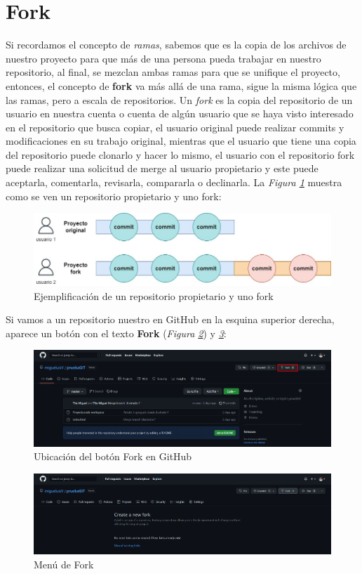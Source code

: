 \section{Fork}

Si recordamos el concepto de \textit{ramas}, sabemos que es la copia de los archivos de nuestro proyecto para que más de una persona pueda trabajar en nuestro repositorio, al final, se mezclan ambas ramas para que se unifique el proyecto, entonces, el concepto de \textbf{fork} va más allá de una rama, sigue la misma lógica que las ramas, pero a escala de repositorios. Un \textit{fork} es la copia del repositorio de un usuario en nuestra cuenta o cuenta de algún usuario que se haya visto interesado en el repositorio que busca copiar, el usuario original puede realizar commits y modificaciones en su trabajo original, mientras que el usuario que tiene una copia del repositorio puede clonarlo y hacer lo mismo, el usuario con el repositorio fork puede realizar una solicitud de merge al usuario propietario y este puede aceptarla, comentarla, revisarla, compararla o declinarla. La \textit{Figura \ref{fig: 35}} muestra como se ven un repositorio propietario y uno fork:
\begin{figure}[H]
    \centering
    \caption{Ejemplificación de un repositorio propietario y uno fork}
    \label{fig: 35}
    \includegraphics[width=13cm]{capturas/fork1.jpg}
\end{figure}

Si vamos a un repositorio nuestro en GitHub en la esquina superior derecha, aparece un botón con el texto \textbf{Fork} (\textit{Figura \ref{fig: 36}}) y \textit{\ref{fig: 37}}:
\begin{figure}[H]
    \centering
    \caption{Ubicación del botón Fork en GitHub}
    \label{fig: 36}
    \includegraphics[width=13cm]{capturas/fork2.png}
\end{figure}
\begin{figure}[H]
    \centering
    \caption{Menú de Fork}
    \label{fig: 37}
    \includegraphics[width=13cm]{capturas/fork3.png}
\end{figure}

